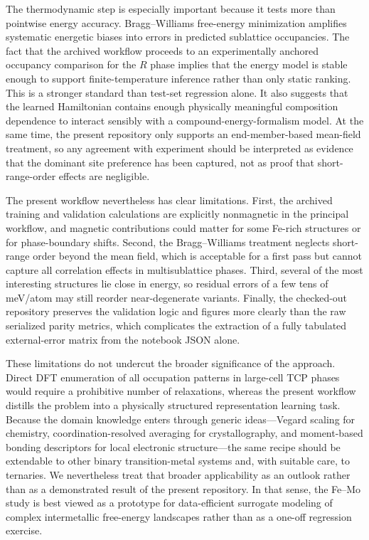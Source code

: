 The thermodynamic step is especially important because it tests more than pointwise energy accuracy. Bragg--Williams free-energy minimization amplifies systematic energetic biases into errors in predicted sublattice occupancies. The fact that the archived workflow proceeds to an experimentally anchored occupancy comparison for the $R$ phase implies that the energy model is stable enough to support finite-temperature inference rather than only static ranking. This is a stronger standard than test-set regression alone. It also suggests that the learned Hamiltonian contains enough physically meaningful composition dependence to interact sensibly with a compound-energy-formalism model. At the same time, the present repository only supports an end-member-based mean-field treatment, so any agreement with experiment should be interpreted as evidence that the dominant site preference has been captured, not as proof that short-range-order effects are negligible.

The present workflow nevertheless has clear limitations. First, the archived training and validation calculations are explicitly nonmagnetic in the principal workflow, and magnetic contributions could matter for some Fe-rich structures or for phase-boundary shifts. Second, the Bragg--Williams treatment neglects short-range order beyond the mean field, which is acceptable for a first pass but cannot capture all correlation effects in multisublattice phases. Third, several of the most interesting structures lie close in energy, so residual errors of a few tens of meV/atom may still reorder near-degenerate variants. Finally, the checked-out repository preserves the validation logic and figures more clearly than the raw serialized parity metrics, which complicates the extraction of a fully tabulated external-error matrix from the notebook JSON alone.

These limitations do not undercut the broader significance of the approach. Direct DFT enumeration of all occupation patterns in large-cell TCP phases would require a prohibitive number of relaxations, whereas the present workflow distills the problem into a physically structured representation learning task. Because the domain knowledge enters through generic ideas---Vegard scaling for chemistry, coordination-resolved averaging for crystallography, and moment-based bonding descriptors for local electronic structure---the same recipe should be extendable to other binary transition-metal systems and, with suitable care, to ternaries. We nevertheless treat that broader applicability as an outlook rather than as a demonstrated result of the present repository. In that sense, the Fe--Mo study is best viewed as a prototype for data-efficient surrogate modeling of complex intermetallic free-energy landscapes rather than as a one-off regression exercise.
